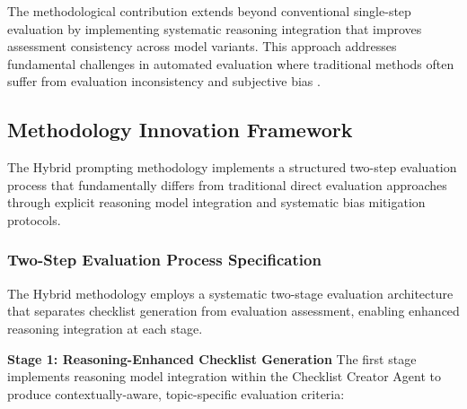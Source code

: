 The methodological contribution extends beyond conventional single-step evaluation by implementing systematic reasoning integration that improves assessment consistency across model variants. This approach addresses fundamental challenges in automated evaluation where traditional methods often suffer from evaluation inconsistency and subjective bias \cite{agashe2023llm_coordination, grötschla2025agentsnet}.

\subsection{Methodology Innovation Framework}
\label{subsec:methodology-innovation-framework}

The Hybrid prompting methodology implements a structured two-step evaluation process that fundamentally differs from traditional direct evaluation approaches through explicit reasoning model integration and systematic bias mitigation protocols.

\subsubsection{Two-Step Evaluation Process Specification}

The Hybrid methodology employs a systematic two-stage evaluation architecture that separates checklist generation from evaluation assessment, enabling enhanced reasoning integration at each stage.

\textbf{Stage 1: Reasoning-Enhanced Checklist Generation}
The first stage implements reasoning model integration within the Checklist Creator Agent to produce contextually-aware, topic-specific evaluation criteria:

